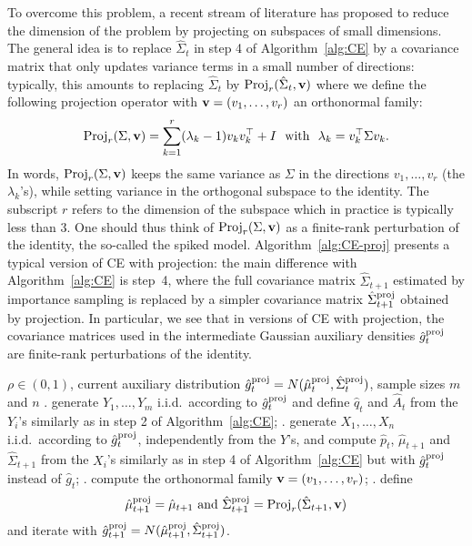 \documentclass[]{article}
\newcommand{\npar}{{n}}
\newcommand{\Proj}{{\textnormal{\textrm{Proj}}}} %
\newcommand{\proj}{{\textnormal{\textrm{proj}}}} %
\theoremstyle{plain}
\theoremstyle{definition}
\begin{document}
To overcome this problem, a recent stream of literature has proposed to reduce the dimension of the problem by projecting on subspaces of small dimensions. The general idea is to replace $\hat \Sigma_t$ in step 4 of Algorithm~\ref{alg:CE} by a covariance matrix that only updates variance terms in a small number of directions: typically, this amounts to replacing $\hat \Sigma_t$ by $\Proj_r(\hat \Sigma_t, {\bf v})$ where we define the following projection operator with ${\bf v} = (v_1, \dots, v_r)$ an orthonormal family:
\begin{equation} \label{eq:Proj}
	\Proj_r(\Sigma, {\bf v}) = \sum_{k=1}^r (\lambda_k - 1) v_k v_k^\top + I \ \text{ with } \ \lambda_k = v_k^\top \Sigma v_k.
\end{equation}
In words, $\Proj_r(\Sigma, {\bf v})$ keeps the same variance as $\Sigma$ in the directions $v_1, \ldots, v_r$ (the $\lambda_k$'s), while setting variance in the orthogonal subspace to the identity. The subscript $r$ refers to the dimension of the subspace which in practice is typically less than $3$. One should thus think of $\Proj_r(\Sigma, {\bf v})$ as a finite-rank perturbation of the identity, the so-called the spiked model. Algorithm~\ref{alg:CE-proj} presents a typical version of CE with projection: the main difference with Algorithm~\ref{alg:CE} is step~4, where the full covariance matrix $\hat \Sigma_{t+1}$ estimated by importance sampling is replaced by a simpler covariance matrix $\hat \Sigma^\proj_{t+1}$ obtained by projection. In particular, we see that in versions of CE with projection, the covariance matrices used in the intermediate Gaussian auxiliary densities $\hat g_t^\proj$ are finite-rank perturbations of the identity.
%
\begin{algorithm}[t]
\caption{One iteration of CE with projection}\label{alg:CE-proj}
\begin{algorithmic}
\Require $\rho \in (0,1)$, current auxiliary distribution $\hat g^\proj_t = N(\hat \mu^\proj_t, \hat \Sigma^\proj_t)$, sample sizes $m$ and $\npar$
. generate $Y_1, \ldots, Y_m$ i.i.d.\ according to $\hat g_t^\proj$ and define $\hat q_t$ and $\hat A_t$ from the $Y_i$'s similarly as in step 2 of Algorithm~\ref{alg:CE};
. generate $X_1, \ldots, X_\npar$ i.i.d.\ according to $\hat g_t^\proj$, independently from the $Y$'s, and compute $\hat p_t$, $\hat \mu_{t+1}$ and $\hat \Sigma_{t+1}$ from the $X_i$'s similarly as in step 4 of Algorithm~\ref{alg:CE} but with $\hat g^\proj_t$ instead of $\hat g_t$;
. compute the orthonormal family ${\bf v} = (v_1, \dots, v_r)$;
. define 
\begin{align}\label{eq:Sigma-proj}
\hat \mu^\proj_{t+1} = \hat \mu_{t+1} \text{ and } \hat \Sigma^\proj_{t+1} = \Proj_r(\hat \Sigma_{t+1}, {\bf v})
\end{align}
and iterate with $\hat g_{t+1}^\proj = N(\hat \mu^\proj_{t+1}, \hat \Sigma_{t+1}^\proj)$.
\end{algorithmic}
\end{algorithm}
%
\end{document}
